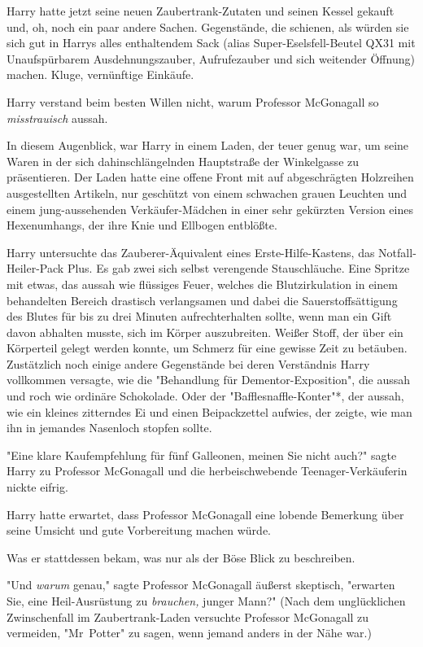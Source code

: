 {\later

Harry hatte jetzt seine neuen Zaubertrank-Zutaten und seinen Kessel gekauft und, oh, noch ein paar andere Sachen. Gegenstände, die schienen, als würden sie sich gut in Harrys alles enthaltendem Sack (alias Super-Eselsfell-Beutel QX31 mit Unaufspürbarem Ausdehnungszauber, Aufrufezauber und sich weitender Öffnung) machen. Kluge, vernünftige Einkäufe.

Harry verstand beim besten Willen nicht, warum Professor McGonagall so \emph{misstrauisch} aussah.

In diesem Augenblick, war Harry in einem Laden, der teuer genug war, um seine Waren in der sich dahinschlängelnden Hauptstraße der Winkelgasse zu präsentieren. Der Laden hatte eine offene Front mit auf abgeschrägten Holzreihen ausgestellten Artikeln, nur geschützt von einem schwachen grauen Leuchten und einem jung-aussehenden Verkäufer-Mädchen in einer sehr gekürzten Version eines Hexenumhangs, der ihre Knie und Ellbogen entblößte.

Harry untersuchte das Zauberer-Äquivalent eines Erste-Hilfe-Kastens, das Notfall-Heiler-Pack Plus. Es gab zwei sich selbst verengende Stauschläuche. Eine Spritze mit etwas, das aussah wie flüssiges Feuer, welches die Blutzirkulation in einem behandelten Bereich drastisch verlangsamen und dabei die Sauerstoffsättigung des Blutes für bis zu drei Minuten aufrechterhalten sollte, wenn man ein Gift davon abhalten musste, sich im Körper auszubreiten. Weißer Stoff, der über ein Körperteil gelegt werden konnte, um Schmerz für eine gewisse Zeit zu betäuben. Zustätzlich noch einige andere Gegenstände bei deren Verständnis Harry vollkommen versagte, wie die "Behandlung für Dementor-Exposition", die aussah und roch wie ordinäre Schokolade. Oder der "Bafflesnaffle-Konter"*, der aussah, wie ein kleines zitterndes Ei und einen Beipackzettel aufwies, der zeigte, wie man ihn in jemandes Nasenloch stopfen sollte.

"Eine klare Kaufempfehlung für fünf Galleonen, meinen Sie nicht auch?" sagte Harry zu Professor McGonagall und die herbeischwebende Teenager-Verkäuferin nickte eifrig.

Harry hatte erwartet, dass Professor McGonagall eine lobende Bemerkung über seine Umsicht und gute Vorbereitung machen würde.

Was er stattdessen bekam, was nur als der Böse Blick zu beschreiben.

"Und \emph{warum} genau," sagte Professor McGonagall äußerst skeptisch, "erwarten Sie, eine Heil-Ausrüstung zu \emph{brauchen,} junger Mann?" (Nach dem unglücklichen Zwinschenfall im Zaubertrank-Laden versuchte Professor McGonagall zu vermeiden, "Mr~Potter" zu sagen, wenn jemand anders in der Nähe war.)

}
